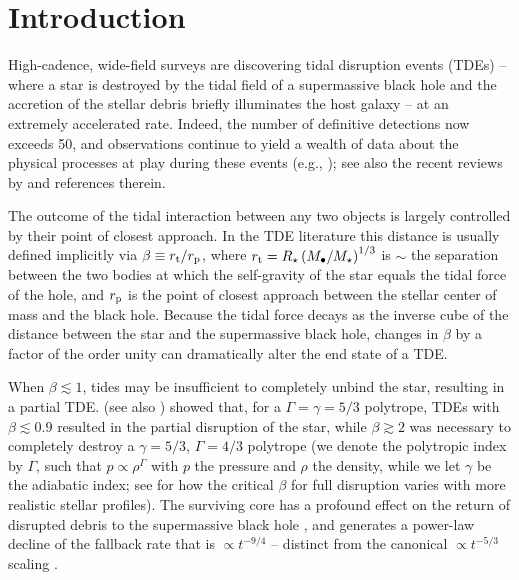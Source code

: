 \documentclass[twocolumn]{aastex62}
\begin{document}
\section{Introduction}
High-cadence, wide-field surveys are discovering tidal disruption events (TDEs) -- where a star is destroyed by the tidal field of a supermassive black hole and the accretion of the stellar debris briefly illuminates the host galaxy -- at an extremely accelerated rate.  Indeed, the number of definitive detections now exceeds 50, and observations continue to yield a wealth of data about the physical processes at play during these events (e.g., \citealt{Bade:1996aa, Komossa:1999aa, Esquej:2007aa, Gezari:2009aa, Gezari:2012aa, Holoien:2014aa, Miller:2015ab, Vinko:2015aa, Alexander:2016aa, Cenko:2016aa, Holoien:2016aa, jiang16, Kara:2016aa, vanVelzen:2016aa, Alexander:2017aa, Blanchard:2017aa, Brown:2017aa, Gezari:2017aa, Hung:2017aa, Saxton:2017aa, Brown:2018aa, Pasham:2018aa, Blagorodnova:2019aa, Hung:2019aa, Holoien:2019aa, Leloudas:2019aa, Nicholl:2019aa, Pasham:2019aa, Saxton:2019aa, Hung:2020aa, Hung:2020ab, Holoien:2020aa, Jonker:2020aa, Kajava:2020aa, Li:2020aa, Hinkle:2021aa, jiang21, Payne:2021aa, vanVelzen:2021aa}); see also the recent reviews by \citet{Alexander:2020aa, vanVelzen:2020aa, Saxton:2020aa, Gezari:2021aa} and references therein.

The outcome of the tidal interaction between any two objects is largely controlled by their point of closest approach. In the TDE literature this distance is usually defined implicitly via $\beta \equiv r_{\rm t}/r_{\rm p}$, where $r_{\rm t} = R_{\star}\left(M_{\bullet}/M_{\star}\right)^{1/3}$ is $\sim$ the separation between the two bodies at which the self-gravity of the star equals the tidal force of the hole, and $r_{\rm p}$ is the point of closest approach between the stellar center of mass and the black hole. Because the tidal force decays as the inverse cube of the distance between the star and the supermassive black hole, changes in $\beta$ by a factor of the order unity can dramatically alter the end state of a TDE. 

When $\beta \lesssim 1$, tides may be insufficient to completely unbind the star, resulting in a partial TDE. \citet{Guillochon:2013aa} (see also \citealt{Mainetti:2017aa}) showed that, for a $\Gamma = \gamma = 5/3$ polytrope, TDEs with $\beta \lesssim 0.9$ resulted in the partial disruption of the star, while $\beta \gtrsim 2$ was necessary to completely destroy a $\gamma = 5/3$, $\Gamma = 4/3$ polytrope (we denote the polytropic index by $\Gamma$, such that $p \propto \rho^{\Gamma}$ with $p$ the pressure and $\rho$ the density, while we let $\gamma$ be the adiabatic index; see \citealt{Golightly:2019ab, Law-Smith:2020aa, Nixon:2021ab} for how the critical $\beta$ for full disruption varies with more realistic stellar profiles). The surviving core has a profound effect on the return of disrupted debris to the supermassive black hole \citep{Guillochon:2013aa}, and generates a power-law decline of the fallback rate that is $\propto t^{-9/4}$ \citep{Coughlin:2019aa, Miles:2020aa, Nixon:2021ab} -- distinct from the canonical $\propto t^{-5/3}$ scaling \citep{Rees:1988aa, Phinney:1989aa}. 
\end{document}
